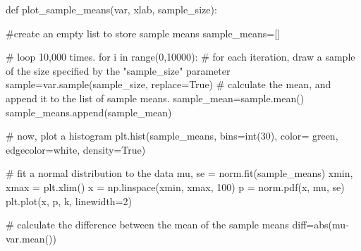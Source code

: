 \documentclass[
  letterpaper,
  DIV=11,
  numbers=noendperiod]{scrreprt}
\newenvironment{Shaded}{\begin{snugshade}}{\end{snugshade}}
\newcommand{\BuiltInTok}[1]{\textcolor[rgb]{0.00,0.23,0.31}{#1}}
\newcommand{\CommentTok}[1]{\textcolor[rgb]{0.37,0.37,0.37}{#1}}
\newcommand{\ControlFlowTok}[1]{\textcolor[rgb]{0.00,0.23,0.31}{#1}}
\newcommand{\DecValTok}[1]{\textcolor[rgb]{0.68,0.00,0.00}{#1}}
\newcommand{\KeywordTok}[1]{\textcolor[rgb]{0.00,0.23,0.31}{#1}}
\newcommand{\NormalTok}[1]{\textcolor[rgb]{0.00,0.23,0.31}{#1}}
\newcommand{\OperatorTok}[1]{\textcolor[rgb]{0.37,0.37,0.37}{#1}}
\newcommand{\StringTok}[1]{\textcolor[rgb]{0.13,0.47,0.30}{#1}}
\newcommand{\VariableTok}[1]{\textcolor[rgb]{0.07,0.07,0.07}{#1}}
\begin{document}
\begin{Shaded}
\begin{Highlighting}[]
\KeywordTok{def}\NormalTok{ plot\_sample\_means(var, xlab, sample\_size):}

    \CommentTok{\#create an empty list to store sample means}
\NormalTok{    sample\_means}\OperatorTok{=}\NormalTok{[]}

    \CommentTok{\# loop 10,000 times.}
    \ControlFlowTok{for}\NormalTok{ i }\KeywordTok{in} \BuiltInTok{range}\NormalTok{(}\DecValTok{0}\NormalTok{,}\DecValTok{10000}\NormalTok{):}
        \CommentTok{\# for each iteration, draw a sample of the size specified by the "sample\_size" parameter}
\NormalTok{        sample}\OperatorTok{=}\NormalTok{var.sample(sample\_size, replace}\OperatorTok{=}\VariableTok{True}\NormalTok{)}
        \CommentTok{\# calculate the mean, and append it to the list of sample means. }
\NormalTok{        sample\_mean}\OperatorTok{=}\NormalTok{sample.mean()}
\NormalTok{        sample\_means.append(sample\_mean)}
    
    \CommentTok{\# now, plot a histogram }
\NormalTok{    plt.hist(sample\_means, bins}\OperatorTok{=}\BuiltInTok{int}\NormalTok{(}\DecValTok{30}\NormalTok{), color}\OperatorTok{=} \StringTok{\textquotesingle{}green\textquotesingle{}}\NormalTok{, edgecolor}\OperatorTok{=}\StringTok{\textquotesingle{}white\textquotesingle{}}\NormalTok{, density}\OperatorTok{=}\VariableTok{True}\NormalTok{)}
    
    \CommentTok{\# fit a normal distribution to the data }
\NormalTok{    mu, se }\OperatorTok{=}\NormalTok{ norm.fit(sample\_means)}
\NormalTok{    xmin, xmax }\OperatorTok{=}\NormalTok{ plt.xlim()}
\NormalTok{    x }\OperatorTok{=}\NormalTok{ np.linspace(xmin, xmax, }\DecValTok{100}\NormalTok{)}
\NormalTok{    p }\OperatorTok{=}\NormalTok{ norm.pdf(x, mu, se) }
\NormalTok{    plt.plot(x, p, }\StringTok{\textquotesingle{}k\textquotesingle{}}\NormalTok{, linewidth}\OperatorTok{=}\DecValTok{2}\NormalTok{)}

    \CommentTok{\# calculate the difference between the mean of the sample means }
\NormalTok{    diff}\OperatorTok{=}\BuiltInTok{abs}\NormalTok{(mu}\OperatorTok{{-}}\NormalTok{var.mean())}
    

\end{Highlighting}
\end{Shaded}
\end{document}
